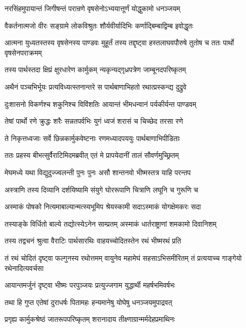 \twolineshloka
{नरसिंहमुपायान्तं जिगीषन्तं परान्रणे}
{वृषसेनोऽभ्ययात्तूर्णं योद्धुकामो धनञ्जयम्}


\twolineshloka
{वैकर्तनात्मजो वीरः सङ्ग्रामे लोकविश्रुतः}
{शौर्यवीर्यादिभिः कर्णाद्बिम्बाद्विम्ब इवोद्धृतः}


\threelineshloka
{आत्मना युध्यतस्तस्य वृषसेनस्य पाण्डवः}
{मुहूर्तं तस्य तद्दृष्ट्वा हस्तलाघवपौरुषे}
{तुतोष च ततः पार्थो वृषसेनपराक्रमम्}


\twolineshloka
{तस्य पार्थस्तदा क्षिप्रं क्षुरधारेण कार्मुकम्}
{न्यकृन्यद्गृध्रपत्रेण जाम्बूनदपरिष्कृतम्}


\twolineshloka
{अथैनं पञ्चभिर्भूयः प्रत्यविध्यत्स्तनान्तरे}
{स पार्थबाणाभिहतो रथात्प्रस्कन्द्य दुद्रुवे}


\twolineshloka
{दुःशासनो विकर्णश्च शकुनिश्च विविंशतिः}
{आयान्तं भीमधन्वानं पर्यकीर्यन्त पाण्डवम्}


\twolineshloka
{तेषां पार्थो रणे क्रुद्धः शरैः सन्नतपर्वभिः}
{युगं ध्वजं शरासं च चिच्छेद तरसा रणे}


\twolineshloka
{ते निकृत्तध्वजाः सर्वे छिन्नकार्मुकवेष्टनाः}
{रणमध्यादपययुः पार्थबाणाभिपीडिताः}


\twolineshloka
{ततः प्रहस्य बीभत्सुर्वैराटिमिदमब्रवीत्}
{एतं मे प्रापयेदानीं तालं सौवर्णमुच्छ्रितम्}


\twolineshloka
{मेघमध्ये यथा विद्युदुज्ज्वलन्ती पुनः पुनः}
{असौ शान्तनवो भीष्मस्तत्र याहि परन्तप}


\twolineshloka
{अस्त्राणि तस्य दिव्यानि दर्शयिष्यामि संयुगे}
{घोररूपाणि चित्राणि लघूनि च गुरूणि च}


\twolineshloka
{अस्माकं पोषको नित्यमाबाल्यान्मत्स्यभूमिप}
{श्रेयस्कामी सदाऽस्माकं योगक्षेमकरः सदा}


\twolineshloka
{तस्याङ्के विर्धितो बाल्ये तद्योत्स्येऽनेन साम्प्रतम्}
{अस्माकं धार्तराष्ट्राणां शमकामो दिवानिशम्}



\twolineshloka
{तस्य तद्वचनं श्रुत्वा वैराटिः पार्थसारथिः}
{वाहयच्चोदितस्तेन रथं भीष्मरथं प्रति}


\threelineshloka
{तं रथं चोदितं दृष्ट्वा फल्गुनस्य रथोत्तमम्}
{वायुनेव महामेघं सहसाऽभिसमीरितम्}
{तं प्रत्ययाच्च गाङ्गेयो रथेनादित्यवर्चसा}


\twolineshloka
{आयान्तमर्जुनं दृष्ट्वा भीष्मः परपुञ्जयः}
{प्रत्युज्जगाम युद्धार्थी महर्षभमिवर्षभः}


\twolineshloka
{तथा हि गुप्त एतेषां दुराधर्षः पितामहः}
{हन्यमानेषु योघेषु धनञ्जयमुपाद्रवत्}


\twolineshloka
{प्रगृह्य कार्मुकश्रेष्ठं जातरूपपरिष्कृतम्}
{शरानादाय तीक्ष्णाग्रान्मर्मदेहप्रमाथिनः}



